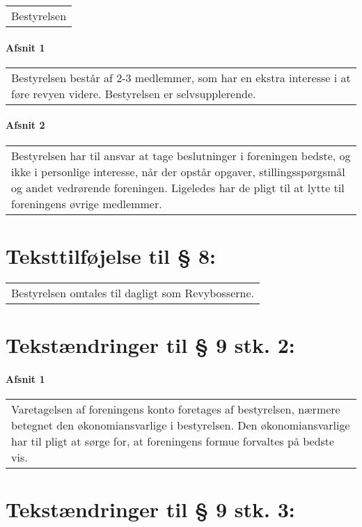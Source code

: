 \documentclass[a4paper,11pt]{report}
\newenvironment{quotationb}%
{\begin{tabular}{|p{10cm}}}%
{\\\end{tabular}}
\begin{document}
\begin{appendices}
\begin{quotationb}
Bestyrelsen
\end{quotationb}

\paragraph{Afsnit 1}

\begin{quotationb}
Bestyrelsen består af 2-3 medlemmer, som har en ekstra interesse i at føre
revyen videre.  Bestyrelsen er selvsupplerende.
\end{quotationb}

\paragraph{Afsnit 2}

\begin{quotationb}
Bestyrelsen har til ansvar at tage beslutninger i foreningen bedste, og ikke
i personlige interesse, når der opstår opgaver, stillingsspørgsmål og andet
vedrørende foreningen.  Ligeledes har de pligt til at lytte til foreningens
øvrige medlemmer.
\end{quotationb}

\section*{Teksttilføjelse til § 8:}

\begin{quotationb}
Bestyrelsen omtales til dagligt som Revybosserne.
\end{quotationb}

\section*{Tekstændringer til § 9 stk. 2:}

\paragraph{Afsnit 1}

\begin{quotationb}
Varetagelsen af foreningens konto foretages af bestyrelsen, nærmere betegnet
den økonomiansvarlige i bestyrelsen.  Den økonomiansvarlige har til pligt at
sørge for, at foreningens formue forvaltes på bedste vis.
\end{quotationb}

\section*{Tekstændringer til § 9 stk. 3:}


\end{appendices}
\end{document}
